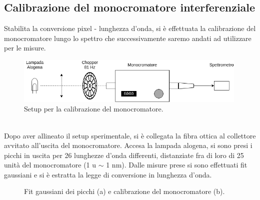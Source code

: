 \documentclass[11pt]{article} %
\begin{document}
\subsection{Calibrazione del monocromatore interferenziale}
Stabilita la conversione pixel - lunghezza d'onda, si è effettuata la calibrazione del monocromatore lungo lo spettro che successivamente saremo andati ad utilizzare per le misure.
\begin{figure}[h!]
\begin{center}
\includegraphics[width=420px]{img/cal_mono.png}
\caption{Setup per la calibrazione del monocromatore.}
\end{center}
\end{figure}
\\Dopo aver allineato il setup sperimentale, si è collegata la fibra ottica al collettore avvitato all'uscita del monocromatore. Accesa la lampada alogena, si sono presi i picchi in uscita per 26 lunghezze d'onda differenti, distanziate fra di loro di 25 unità del monocromatore (1 u $\sim$ 1 nm). Dalle misure prese si sono effettuati fit gaussiani e si è estratta la legge di conversione in lunghezza d'onda.
\begin{figure}[!h]
\centering
\caption{Fit gaussiani dei picchi (a) e calibrazione del monocromatore (b).}
\end{figure}
\\
\end{document}
